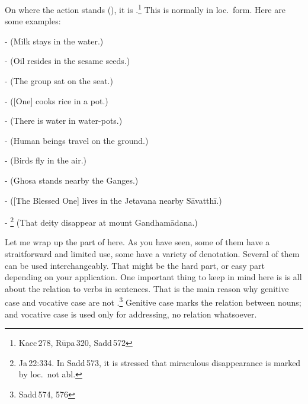 On where the action stands (), it is .\footnote{Kacc\,278, R\=upa\,320, Sadd\,572} This  is normally in loc.\ form. Here are some examples:\par
-  (Milk stays in the water.)\par
-  (Oil resides in the sesame seeds.)\par
-  (The group sat on the seat.)\par
-  ([One] cooks rice in a pot.)\par
-  (There is water in water-pots.)\par
-  (Human beings travel on the ground.)\par
-  (Birds fly in the air.)\par
-  (Ghosa stands nearby the Ganges.)\par
-  ([The Blessed One] lives in the Jetavana nearby S\=avatth\=i.)\par
- \footnote{Ja\,22:334. In Sadd\,573, it is stressed that miraculous disappearance is marked by loc.\ not abl.} (That deity disappear at mount Gandham\=adana.)\par

\bigskip
Let me wrap up the part of  here. As you have seen, some of them have a straitforward and limited use, some have a variety of denotation. Several of them can be used interchangeably. That might be the hard part, or easy part depending on your application. One important thing to keep in mind here is  is all about the relation to verbs in sentences. That is the main reason why genitive case and vocative case are not .\footnote{Sadd\,574, 576} Genitive case marks the relation between nouns; and vocative case is used only for addressing, no relation whatsoever.

